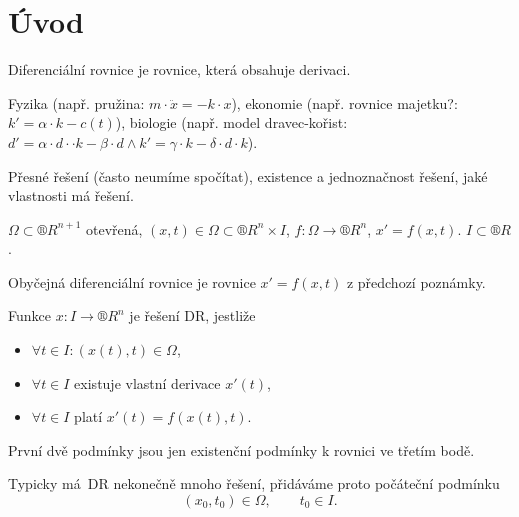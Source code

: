 \documentclass[12pt]{article}					%
\begin{document}
\section{Úvod}
\begin{definice}
	Diferenciální rovnice je rovnice, která obsahuje derivaci.
\end{definice}

\begin{poznamka}[Motivace]
	Fyzika (např. pružina: $m·\ddot{x} = -k·x$), ekonomie (např. rovnice majetku?: $k' = \alpha·k - c(t)$), biologie (např. model dravec-kořist: $d' = \alpha·d··k - \beta·d \land k' = \gamma·k - \delta·d·k$).
\end{poznamka}

\begin{poznamka}
	Přesné řešení (často neumíme spočítat), existence a jednoznačnost řešení, jaké vlastnosti má řešení.
\end{poznamka}

\begin{poznamka}[Předpoklady]
	$\Omega \subset ®R^{n + 1}$ otevřená, $(x, t) \in \Omega \subset ®R^n \times I$, $f: \Omega \rightarrow ®R^n$, $x' = f(x, t)$. $I \subset ®R$.
\end{poznamka}

\begin{definice}
	Obyčejná diferenciální rovnice je rovnice $x' = f(x, t)$ z předchozí poznámky.

	Funkce $x: I \rightarrow ®R^n$ je řešení DR, jestliže
	\begin{itemize}
		\item $\forall t \in I: (x(t), t) \in \Omega$,
		\item $\forall t \in I$ existuje vlastní derivace $x'(t)$,
		\item $\forall t \in I$ platí $x'(t) = f(x(t), t)$.
	\end{itemize}

	\begin{poznamkain}
		První dvě podmínky jsou jen existenční podmínky k rovnici ve třetím bodě.
	\end{poznamkain}

	Typicky má DR nekonečně mnoho řešení, přidáváme proto počáteční podmínku
	$$ (x_0, t_0) \in \Omega, \qquad t_0 \in I. $$
\end{definice}
\end{document}
